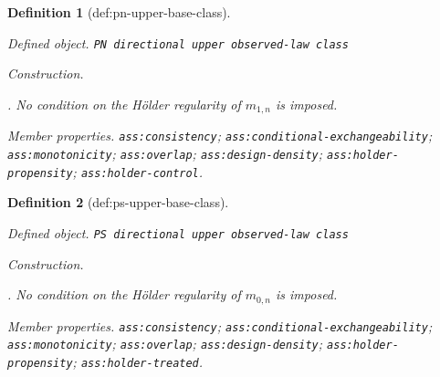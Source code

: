 \documentclass{article}
\newtheorem{definition}{Definition}
\begin{document}
\begin{definition}[def:pn-upper-base-class]\label{def:pn-upper-base-class}
\par\smallskip\noindent\emph{Defined object.} \texttt{PN directional upper observed-\allowbreak{}law class}
\par\smallskip\noindent\emph{Construction.} \par\noindent {}\par\noindent. No condition on the H\"older regularity of \(m_{1,n}\) is imposed.
\par\smallskip\noindent\emph{Member properties.} \texttt{ass:\allowbreak{}consistency}; \texttt{ass:\allowbreak{}conditional-\allowbreak{}exchangeability}; \texttt{ass:\allowbreak{}monotonicity}; \texttt{ass:\allowbreak{}overlap}; \texttt{ass:\allowbreak{}design-\allowbreak{}density}; \texttt{ass:\allowbreak{}holder-\allowbreak{}propensity}; \texttt{ass:\allowbreak{}holder-\allowbreak{}control}.
\end{definition}

\begin{definition}[def:ps-upper-base-class]\label{def:ps-upper-base-class}
\par\smallskip\noindent\emph{Defined object.} \texttt{PS directional upper observed-\allowbreak{}law class}
\par\smallskip\noindent\emph{Construction.} \par\noindent {}\par\noindent. No condition on the H\"older regularity of \(m_{0,n}\) is imposed.
\par\smallskip\noindent\emph{Member properties.} \texttt{ass:\allowbreak{}consistency}; \texttt{ass:\allowbreak{}conditional-\allowbreak{}exchangeability}; \texttt{ass:\allowbreak{}monotonicity}; \texttt{ass:\allowbreak{}overlap}; \texttt{ass:\allowbreak{}design-\allowbreak{}density}; \texttt{ass:\allowbreak{}holder-\allowbreak{}propensity}; \texttt{ass:\allowbreak{}holder-\allowbreak{}treated}.
\end{definition}
\end{document}
